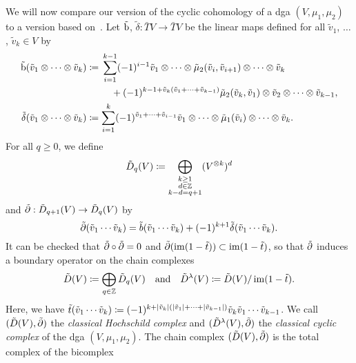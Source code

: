 \documentclass[\MainFolder/Text.tex]{subfiles}
\begin{document}
We will now compare our version of the cyclic cohomology of a dga $(V,\mu_1, \mu_2)$ to a version based on~\cite[Section 5.3.2]{LodayCyclic}. Let $\tilde{\mathrm{b}}$, $\tilde{\delta}: \bar{T}V \rightarrow \bar{T}V$ be the linear maps defined for all $\tilde{v}_1$, $\dotsc$, $\tilde{v}_k \in V$ by
\allowdisplaybreaks
\begin{align*}
   \tilde{\Hd}(\tilde{v}_1\otimes \dotsb \otimes \tilde{v}_k) & \coloneqq \begin{multlined}[t] \sum_{i=1}^{k-1} (-1)^{i-1} \tilde{v}_1 \otimes \dotsb \otimes \tilde{\mu}_2(\tilde{v}_i, \tilde{v}_{i+1}) \otimes \dotsb \otimes \tilde{v}_k  \\ {}+ (-1)^{k-1+ \tilde{v}_k(\tilde{v}_1 + \dotsb + \tilde{v}_{k-1})}\tilde{\mu}_2(\tilde{v}_k, \tilde{v}_1)\otimes\tilde{v}_2\otimes\dotsb\otimes\tilde{v}_{k-1}, 
\end{multlined} \\ 
\tilde{\delta}(\tilde{v}_1\otimes \dotsb \otimes \tilde{v}_k) & \coloneqq  \sum_{i=1}^k (-1)^{\tilde{v}_1 + \dotsb + \tilde{v}_{i-1}} \tilde{v}_1\otimes\dotsb \otimes \tilde{\mu}_1(\tilde{v}_i)\otimes \dotsb \otimes \tilde{v}_k.
\end{align*}
For all $q\ge 0$, we define
$$ \tilde{D}_q(V) \coloneqq \bigoplus_{\substack{k\ge 1 \\ d\in \mathbb{Z} \\k-d= q + 1}} (V^{\otimes k})^d $$
and $\tilde{\partial}: \tilde{D}_{q+1}(V) \rightarrow \tilde{D}_{q}(V)$ by   
$$ \tilde{\partial}(\tilde{v}_1\dotsb \tilde{v}_k) = \tilde{b}(\tilde{v}_1\dotsb \tilde{v}_k) + (-1)^{k+1} \tilde{\delta}(\tilde{v}_1\dotsb \tilde{v}_k). $$
It can be checked that $\tilde{\partial}\circ\tilde{\partial}=0$ and $\tilde{\partial}(\operatorname{im}(1-\tilde{t}))\subset \operatorname{im}(1-\tilde{t})$, so that $\tilde{\partial}$ induces a boundary operator on
the chain complexes 
$$ \tilde{D}(V)\coloneqq \bigoplus_{q\in \mathbb{Z}} \tilde{D}_q(V)\quad\text{and}\quad\tilde{D}^\lambda(V) \coloneqq \tilde{D}(V)/\operatorname{im}(1-\tilde{t}). $$
Here, we have $\tilde{t}(\tilde{v}_1 \dotsb \tilde{v}_k) \coloneqq (-1)^{k + |\tilde{v}_k|(|\tilde{v}_1| + \dotsb + |\tilde{v}_{k-1}|)} \tilde{v}_k \tilde{v}_1 \dotsb \tilde{v}_{k-1}$. We call $(\tilde{D}(V),\tilde{\partial})$ the \emph{classical Hochschild complex} and $(\tilde{D}^\lambda(V), \tilde{\partial})$ the \emph{classical cyclic complex} of the dga $(V,\mu_1,\mu_2)$. The chain complex $(\tilde{D}(V),\tilde{\partial})$ is the total complex of the bicomplex
\end{document}
